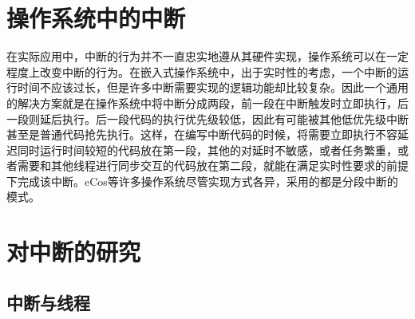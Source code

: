 \section{操作系统中的中断}
在实际应用中，中断的行为并不一直忠实地遵从其硬件实现，操作系统可以在一定程度上改变中断的行为。在嵌入式操作系统中，出于实时性的考虑，一个中断的运行时间不应该过长，但是许多中断需要实现的逻辑功能却比较复杂。因此一个通用的解决方案就是在操作系统中将中断分成两段，前一段在中断触发时立即执行，后一段则延后执行。后一段代码的执行优先级较低，因此有可能被其他低优先级中断甚至是普通代码抢先执行。这样，在编写中断代码的时候，将需要立即执行不容延迟同时运行时间较短的代码放在第一段，其他的对延时不敏感，或者任务繁重，或者需要和其他线程进行同步交互的代码放在第二段，就能在满足实时性要求的前提下完成该中断。eCos等许多操作系统尽管实现方式各异，采用的都是分段中断的模式。\cite{ecos}

\section{对中断的研究}

\subsection{中断与线程}
